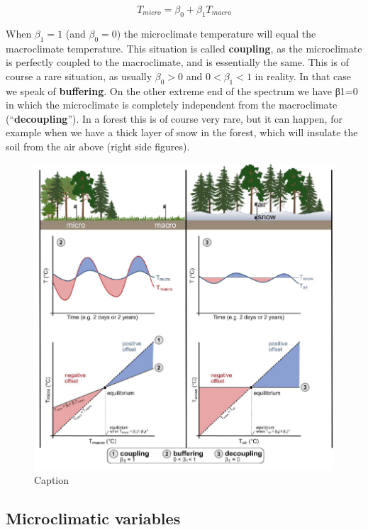 \documentclass[12pt,oneside]{book}
\begin{document}
\begin{equation} 
 T_{micro} = \beta_0 + \beta_1 T_{macro}
  \label{eq:EqMicro2}
\end{equation}

When \(β_1=1\) (and \(β_0=0\)) the microclimate temperature will equal
the macroclimate temperature. This situation is called
\textbf{coupling}, as the microclimate is perfectly coupled to the
macroclimate, and is essentially the same. This is of course a rare
situation, as usually \(β_0>0\) and \(0<β_1<1\) in reality. In that case
we speak of \textbf{buffering}. On the other extreme end of the spectrum
we have β1=0 in which the microclimate is completely independent from
the macroclimate (``\textbf{decoupling}''). In a forest this is of
course very rare, but it can happen, for example when we have a thick
layer of snow in the forest, which will insulate the soil from the air
above (right side figures).

\begin{figure}

{\centering \includegraphics[width=0.8\linewidth]{figures/Figure106} 

}

\caption{Caption}\label{fig:Micro6}
\end{figure}

\subsection{Microclimatic variables}\label{microclimatic-variables}
\end{document}

